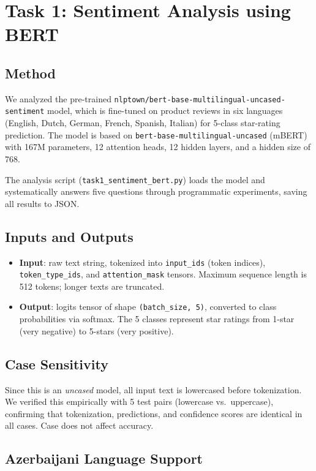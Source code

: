 \documentclass[10pt,a4paper]{article}
\begin{document}
\section{Task 1: Sentiment Analysis using BERT}

\subsection{Method}

We analyzed the pre-trained \texttt{nlptown/bert-base-multilingual-uncased-sentiment} model, which is fine-tuned on product reviews in six languages (English, Dutch, German, French, Spanish, Italian) for 5-class star-rating prediction. The model is based on \texttt{bert-base-multilingual-uncased} (mBERT) with 167M parameters, 12 attention heads, 12 hidden layers, and a hidden size of 768.

The analysis script (\texttt{task1\_sentiment\_bert.py}) loads the model and systematically answers five questions through programmatic experiments, saving all results to JSON.

\subsection{Inputs and Outputs}

\begin{itemize}
    \item \textbf{Input}: raw text string, tokenized into \texttt{input\_ids} (token indices), \texttt{token\_type\_ids}, and \texttt{attention\_mask} tensors. Maximum sequence length is 512 tokens; longer texts are truncated.
    \item \textbf{Output}: logits tensor of shape \texttt{(batch\_size, 5)}, converted to class probabilities via softmax. The 5 classes represent star ratings from 1-star (very negative) to 5-stars (very positive).
\end{itemize}

\subsection{Case Sensitivity}

Since this is an \emph{uncased} model, all input text is lowercased before tokenization. We verified this empirically with 5 test pairs (lowercase vs.\ uppercase), confirming that tokenization, predictions, and confidence scores are identical in all cases. Case does not affect accuracy.

\subsection{Azerbaijani Language Support}
\end{document}
